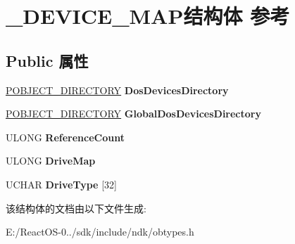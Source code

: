 \hypertarget{struct___d_e_v_i_c_e___m_a_p}{}\section{\+\_\+\+D\+E\+V\+I\+C\+E\+\_\+\+M\+A\+P结构体 参考}
\label{struct___d_e_v_i_c_e___m_a_p}
\subsection*{Public 属性}
\begin{DoxyCompactItemize}
\item 
\mbox{\label{struct___d_e_v_i_c_e___m_a_p_a61ba4242239944e182a1849532fbd6c4}} 
\hyperlink{struct___o_b_j_e_c_t___d_i_r_e_c_t_o_r_y}{P\+O\+B\+J\+E\+C\+T\+\_\+\+D\+I\+R\+E\+C\+T\+O\+RY} {\bfseries Dos\+Devices\+Directory}
\item 
\mbox{\label{struct___d_e_v_i_c_e___m_a_p_aa298090815dcff1c69c7483b1fccc78d}} 
\hyperlink{struct___o_b_j_e_c_t___d_i_r_e_c_t_o_r_y}{P\+O\+B\+J\+E\+C\+T\+\_\+\+D\+I\+R\+E\+C\+T\+O\+RY} {\bfseries Global\+Dos\+Devices\+Directory}
\item 
\mbox{\label{struct___d_e_v_i_c_e___m_a_p_a0f4f2adc7c913fd9e4e69b55d8493350}} 
U\+L\+O\+NG {\bfseries Reference\+Count}
\item 
\mbox{\label{struct___d_e_v_i_c_e___m_a_p_ac2db4318d78f679bb126c0195ce46137}} 
U\+L\+O\+NG {\bfseries Drive\+Map}
\item 
\mbox{\label{struct___d_e_v_i_c_e___m_a_p_a06325745af5bda358dca2cd40680ce70}} 
U\+C\+H\+AR {\bfseries Drive\+Type} \mbox{[}32\mbox{]}
\end{DoxyCompactItemize}


该结构体的文档由以下文件生成\+:\begin{DoxyCompactItemize}
\item 
E\+:/\+React\+O\+S-\/0../sdk/include/ndk/obtypes.\+h\end{DoxyCompactItemize}
